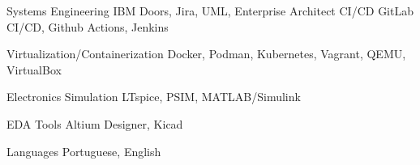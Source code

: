 \begin{cvskills}
  \cvskill
  {Systems Engineering} %
  {IBM Doors, Jira, UML, Enterprise Architect} %
  \cvskill
  {CI/CD} %
  {GitLab CI/CD, Github Actions, Jenkins} %

  \cvskill
  {Virtualization/Containerization} %
  {Docker, Podman, Kubernetes, Vagrant, QEMU, VirtualBox} %

  \cvskill
  {Electronics Simulation} %
  {LTspice, PSIM, MATLAB/Simulink} %

  \cvskill
  {EDA Tools} %
  {Altium Designer, Kicad} %

  \cvskill
  {Languages} %
  {Portuguese, English} %

\end{cvskills}

